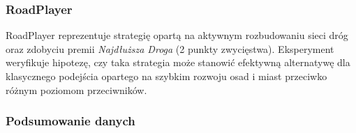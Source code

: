 \documentclass[polish,inz,longabstract]{iithesis}
\begin{document}
\subsubsection{RoadPlayer}

RoadPlayer reprezentuje strategię opartą na aktywnym rozbudowaniu sieci dróg oraz zdobyciu premii \textit{Najdłuższa Droga} (2 punkty zwycięstwa). Eksperyment weryfikuje hipotezę, czy taka strategia może stanowić efektywną alternatywę dla klasycznego podejścia opartego na szybkim rozwoju osad i miast przeciwko różnym poziomom przeciwników.

\subsubsection{Podsumowanie danych}

\begin{table}[h]
\centering
\caption{Podsumowanie wyników RoadPlayer – skuteczność i tempo}
\medskip
\label{tab:roadplayer-main}
\end{table}
\end{document}
